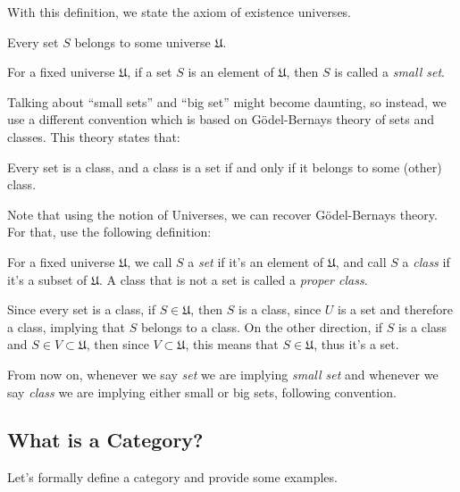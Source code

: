 With this definition, we state the axiom of existence universes.
\begin{axiom}
  Every set $S$ belongs to some universe $\mathfrak U$.
\end{axiom}

\begin{definition}
  For a fixed universe $\mathfrak U$, if a set $S$ is an element of $\mathfrak U$,
  then $S$ is called a \textit{small set}.
\end{definition}

Talking about ``small sets'' and ``big set'' might become daunting, so instead, we
use a different convention which is based on Gödel-Bernays theory of sets and classes.
This theory states that:
\begin{axiom}
  Every set is a class, and a class is a set if and only if it belongs to some (other)
  class.
  \label{axiom:gb}
\end{axiom}

Note that using the notion of Universes, we can recover Gödel-Bernays theory. For that,
use the following definition:
\begin{definition}
  For a fixed universe $\mathfrak U$, we call $S$ a \textit{set} if it's an element
  of $\mathfrak U$, and call $S$ a \textit{class} if it's a subset of $\mathfrak U$.
  A class that is not a set is called a \textit{proper class}.
\end{definition}
Since every set is a class, if $S \in \mathfrak U$, then $S$ is a class,
since $U$ is a set and therefore a class, implying that $S$ belongs to a class.
On the other direction, if $S$ is a class and $S \in V \subset \mathfrak U$,
then since $V \subset \mathfrak U$, this means that $S \in \mathfrak U$, thus
it's a set.

From now on, whenever we say \textit{set} we are implying \textit{small set}
and whenever we say \textit{class} we are implying either small or big sets,
following \citet{borceux1994handbook} convention.


\subsection{What is a Category?}

Let's formally define a category and provide some examples.

